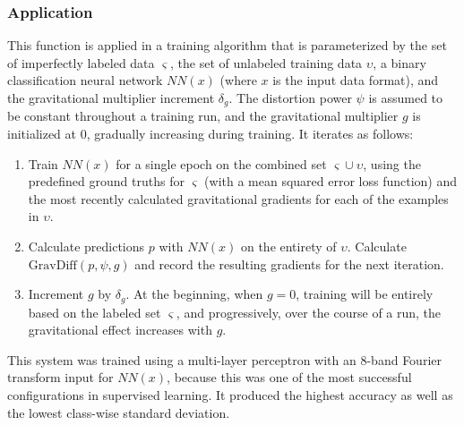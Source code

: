 \documentclass[10pt]{article}
\begin{document}
\subsubsection{Application}

This function is applied in a training algorithm that is parameterized by the set of imperfectly labeled data $\varsigma$, the set of unlabeled training data $\upsilon$, a binary classification neural network $NN(x)$ (where $x$ is the input data format), and the gravitational multiplier increment $\delta_g$. The distortion power $\psi$ is assumed to be constant throughout a training run, and the gravitational multiplier $g$ is initialized at 0, gradually increasing during training. It iterates as follows:

\begin{enumerate}
    \item Train $NN(x)$ for a single epoch on the combined set $\varsigma \cup \upsilon$, using the predefined ground truths for $\varsigma$ (with a mean squared error loss function) and the most recently calculated gravitational gradients for each of the examples in $\upsilon$.
    \item Calculate predictions $p$ with $NN(x)$ on the entirety of $\upsilon$. Calculate $\mathrm{GravDiff}(p, \psi, g)$ and record the resulting gradients for the next iteration.
    \item Increment $g$ by $\delta_{g}$. At the beginning, when $g = 0$, training will be entirely based on the labeled set $\varsigma$, and progressively, over the course of a run, the gravitational effect increases with $g$.
\end{enumerate}

This system was trained using a multi-layer perceptron with an 8-band Fourier transform input for $NN(x)$, because this was one of the most successful configurations in supervised learning. It produced the highest accuracy as well as the lowest class-wise standard deviation.
\end{document}
